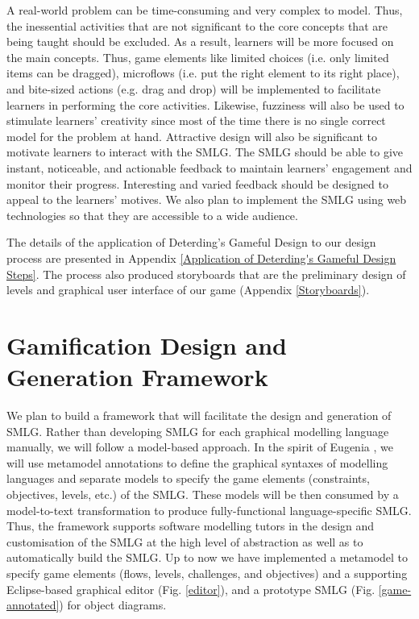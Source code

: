 \documentclass[12pt, a4paper]{report}
\begin{document}
{A real-world problem can be time-consuming and very complex to model. Thus, the inessential activities that are not significant to the core concepts that are being taught should be excluded. As a result, learners will be more focused on the main concepts. Thus, game elements like limited choices (i.e. only limited items can be dragged), microflows (i.e. put the right element to its right place), and bite-sized actions (e.g. drag and drop) will be implemented to facilitate learners in performing the core activities. Likewise, fuzziness will also be used to stimulate learners' creativity since most of the time there is no single correct model for the problem at hand. Attractive design will also be significant to motivate learners to interact with the SMLG. The SMLG should be able to give instant, noticeable, and actionable feedback to maintain learners' engagement and monitor their progress. Interesting and varied feedback should be designed to appeal to the learners' motives. We also plan to implement the SMLG using web technologies so that they are accessible to a wide audience.

The details of the application of Deterding's Gameful Design to our design process are presented in Appendix \ref{Application of Deterding's Gameful Design Steps}. The process also produced storyboards that are the preliminary design of levels and graphical user interface of our game (Appendix \ref{Storyboards}).      

\section{Gamification Design and Generation Framework}
We plan to build a framework that will facilitate the design and generation of SMLG. Rather than developing SMLG for each graphical modelling language manually, we will follow a model-based approach. In the spirit of Eugenia \cite{kolovos2015eugenia}, we will use metamodel annotations to define the graphical syntaxes of modelling languages and separate models to specify the game elements (constraints, objectives, levels, etc.) of the SMLG. These models will be then consumed by a model-to-text transformation to produce fully-functional language-specific SMLG. Thus, the framework supports software modelling tutors in the design and customisation of the SMLG at the high level of abstraction as well as to automatically build the SMLG. Up to now we have implemented a metamodel to specify game elements (flows, levels, challenges, and objectives) and a supporting Eclipse-based graphical editor (Fig. \ref{editor}), and a prototype SMLG (Fig. \ref{game-annotated}) for object diagrams. 

}
\end{document}
